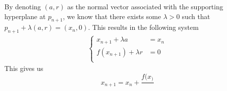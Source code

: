 By denoting $(a, r)$ as the normal vector associated with the supporting hyperplane at $p_{n+1}$, we know that there exists some $\lambda > 0$ such that $p_{n+1} + \lambda (a, r) = (x_n, 0)$. This results in the following system
\begin{align*}
    \left\{
    \begin{array}{ll}
        x_{n+1} + \lambda a &= x_n \\
        f(x_{n+1}) + \lambda r &= 0 \\
    \end{array}
    \right.
\end{align*}
This gives us
\begin{equation*}
    x_{n+1} = x_n + \frac{f(x_)}{}
\end{equation*}